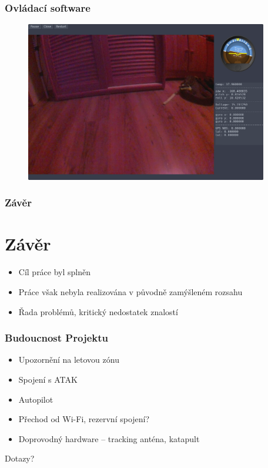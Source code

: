 \documentclass[aspectratio=43]{beamer}
\begin{document}
\begin{frame}[fragile]
	\frametitle{Ovládací software}
	\begin{figure}[h]
		\centering
		\includegraphics[height=7cm]{./../img/interface.png}
	\end{figure}
\end{frame}


\begin{frame}[fragile]
	\frametitle{Závěr}
	\section{Závěr}
	\begin{itemize}
		\item Cíl práce byl splněn
		\item Práce však nebyla realizována v původně zamýšleném rozsahu
		\item Řada problémů, kritický nedostatek znalostí
	\end{itemize}
\end{frame}

\begin{frame}[fragile]
	\frametitle{Budoucnost Projektu}
	\begin{itemize}
		\item Upozornění na letovou zónu
		\item Spojení s ATAK
		\item Autopilot
		\item Přechod od Wi-Fi, rezervní spojení?
		\item Doprovodný hardware -- tracking anténa, katapult
	\end{itemize}
\end{frame}

\appendix
\begin{frame}[plain]
	\centering
	\Huge Dotazy?
\end{frame}
\end{document}
